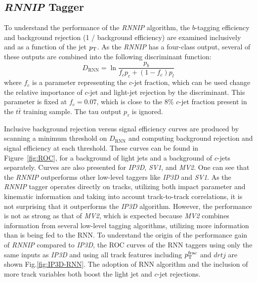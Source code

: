 \subsection{\textit{RNNIP} Tagger}

\label{sec:rnn-result-rnn}

To understand the performance of the \textit{RNNIP} algorithm, the $b$-tagging efficiency and background rejection (1 / background efficiency) are examined inclusively and as a function of the jet $p_{{\rm T}}$. As the \textit{RNNIP} has a four-class output, several of these outputs are combined into the following discriminant function:
\begin{equation}
D_{\mathrm{RNN}} = \ln \frac{p_{b}}{f_c p_c + (1-f_c) p_l}
\end{equation}
where $f_c$ is a parameter representing the $c$-jet fraction, which can be used change the relative importance of $c$-jet and light-jet rejection by the discriminant.  This parameter is fixed at $f_c=0.07$, which is close to the 8\% $c$-jet fraction present in the $t\bar{t}$ training sample. The tau output $p_\tau$ is ignored.

Inclusive background rejection versus signal efficiency curves are produced by scanning a minimum threshold on $D_{\mathrm{RNN}}$ and computing background rejection and signal efficiency at each threshold. These curves can be found in Figure~\ref{fig:ROC}, for a background of light jets and a background of $c$-jets separately.  Curves are also presented for \textit{IP3D}, \textit{SV1}, and \textit{MV2}. One can see that the \textit{RNNIP} outperforms other low-level taggers like \textit{IP3D} and \textit{SV1}. As the \textit{RNNIP} tagger operates directly on tracks, utilizing both impact parameter and kinematic information and taking into account track-to-track correlations, it is not surprising that it outperforms the \textit{IP3D} algorithm.  However, the performance is not as strong as that of \textit{MV2}, which is expected because \textit{MV2} combines information from several low-level tagging algorithms, utilizing more information than is being fed to the RNN. To understand the origin of the performance gain of \textit{RNNIP} compared to \textit{IP3D}, the ROC curves of the RNN taggers using only the same inputs as \textit{IP3D} and using all track features including $p_{\rm T}^{\rm frac}$ and $drtj$ are shown Fig.\ref{fig:IP3D-RNN}. The adoption of RNN algorithm and the inclusion of more track variables both boost the light jet and $c$-jet rejections.

